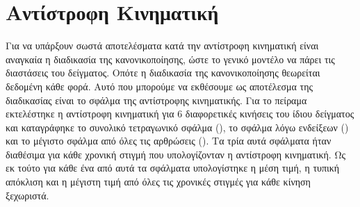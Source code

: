 \section{Αντίστροφη Κινηματική}

Για να υπάρξουν σωστά αποτελέσματα κατά την αντίστροφη κινηματική είναι αναγκαία η διαδικασία της κανονικοποίησης, ώστε το γενικό μοντέλο να πάρει τις διαστάσεις του δείγματος. Οπότε η διαδικασία της κανονικοποίησης θεωρείται δεδομένη κάθε φορά. Αυτό που μπορούμε να εκθέσουμε ως αποτέλεσμα της διαδικασίας είναι το σφάλμα της αντίστροφης κινηματικής. Για το πείραμα εκτελέστηκε η αντίστροφη κινηματική για 6 διαφορετικές κινήσεις του ίδιου δείγματος και καταγράφηκε το συνολικό τετραγωνικό σφάλμα (), το σφάλμα λόγω ενδείξεων () και το μέγιστο σφάλμα από όλες τις αρθρώσεις (). Τα τρία αυτά σφάλματα ήταν διαθέσιμα για κάθε χρονική στιγμή που υπολογίζονταν η αντίστροφη κινηματική. Ως εκ τούτο για κάθε ένα από αυτά τα σφάλματα υπολογίστηκε η μέση τιμή, η τυπική απόκλιση και η μέγιστη τιμή από όλες τις χρονικές στιγμές για κάθε κίνηση ξεχωριστά.

